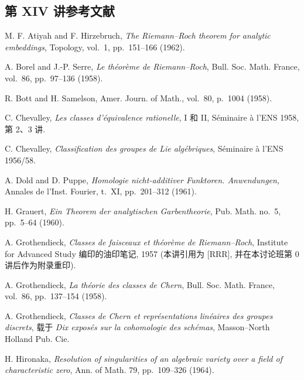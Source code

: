 \subsection*{第 XIV 讲参考文献}

\begin{enumerate}[label={[\arabic*]},leftmargin=3.2em]
\item M. F. Atiyah and F. Hirzebruch,
  \emph{The Riemann--Roch theorem for analytic embeddings},
  Topology, vol.~1, pp.~151--166 (1962).

\item A. Borel and J.-P. Serre,
  \emph{Le th\'eor\`eme de Riemann--Roch},
  Bull. Soc. Math. France, vol.~86, pp.~97--136 (1958).

\item R. Bott and H. Samelson,
  Amer. Journ. of Math., vol.~80, p.~1004 (1958).

\item C. Chevalley,
  \emph{Les classes d'\'equivalence rationelle}, I 和 II,
  S\'eminaire \`a l'ENS 1958, 第 2、3 讲.

\item C. Chevalley,
  \emph{Classification des groupes de Lie alg\'ebriques},
  S\'eminaire \`a l'ENS 1956/58.

\item A. Dold and D. Puppe,
  \emph{Homologie nicht-additiver Funktoren. Anwendungen},
  Annales de l'Inst. Fourier, t.~XI, pp.~201--312 (1961).

\item H. Grauert,
  \emph{Ein Theorem der analytischen Garbentheorie},
  Pub. Math. no.~5, pp.~5--64 (1960).

\item A. Grothendieck,
  \emph{Classes de faisceaux et th\'eor\`eme de Riemann--Roch},
  Institute for Advanced Study 编印的油印笔记, 1957
  (本讲引用为 [RRR], 并在本讨论班第 0 讲后作为附录重印).

\item A. Grothendieck,
  \emph{La th\'eorie des classes de Chern},
  Bull. Soc. Math. France, vol.~86, pp.~137--154 (1958).

\item A. Grothendieck,
  \emph{Classes de Chern et repr\'esentations lin\'eaires des groupes
  discrets}, 载于 \emph{Dix expos\'es sur la cohomologie des sch\'emas},
  Masson--North Holland Pub. Cie.

\item H. Hironaka,
  \emph{Resolution of singularities of an algebraic variety over a field of
  characteristic zero}, Ann. of Math. 79, pp.~109--326 (1964).


\end{enumerate}
